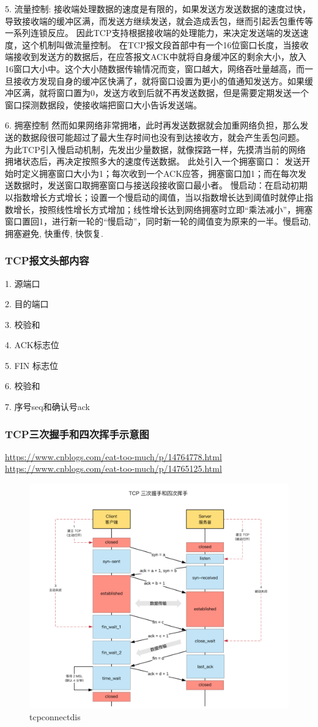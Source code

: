 \documentclass[UTF8]{ctexart}
\begin{document}
5. 流量控制: 接收端处理数据的速度是有限的，如果发送方发送数据的速度过快，导致接收端的缓冲区满，而发送方继续发送，就会造成丢包，继而引起丢包重传等一系列连锁反应。
因此TCP支持根据接收端的处理能力，来决定发送端的发送速度，这个机制叫做流量控制。
在TCP报文段首部中有一个16位窗口长度，当接收端接收到发送方的数据后，在应答报文ACK中就将自身缓冲区的剩余大小，放入16窗口大小中。这个大小随数据传输情况而变，窗口越大，网络吞吐量越高，而一旦接收方发现自身的缓冲区快满了，就将窗口设置为更小的值通知发送方。如果缓冲区满，就将窗口置为0，发送方收到后就不再发送数据，但是需要定期发送一个窗口探测数据段，使接收端把窗口大小告诉发送端。

6. 拥塞控制
然而如果网络非常拥堵，此时再发送数据就会加重网络负担，那么发送的数据段很可能超过了最大生存时间也没有到达接收方，就会产生丢包问题。
为此TCP引入慢启动机制，先发出少量数据，就像探路一样，先摸清当前的网络拥堵状态后，再决定按照多大的速度传送数据。
此处引入一个拥塞窗口：
发送开始时定义拥塞窗口大小为1；每次收到一个ACK应答，拥塞窗口加1；而在每次发送数据时，发送窗口取拥塞窗口与接送段接收窗口最小者。
慢启动：在启动初期以指数增长方式增长；设置一个慢启动的阈值，当以指数增长达到阈值时就停止指数增长，按照线性增长方式增加；线性增长达到网络拥塞时立即“乘法减小”，拥塞窗口置回1，进行新一轮的“慢启动”，同时新一轮的阈值变为原来的一半。慢启动, 拥塞避免, 快重传, 快恢复. \par

\subsubsection{TCP报文头部内容}
1. 源端口

2. 目的端口

3. 校验和

4. ACK标志位

5. FIN 标志位

6. 校验和

7. 序号seq和确认号ack


\subsubsection{TCP三次握手和四次挥手示意图}
\url{https://www.cnblogs.com/eat-too-much/p/14764778.html}
\url{https://www.cnblogs.com/eat-too-much/p/14765125.html}
\begin{figure}
	\centering
	\includegraphics[width=0.7\linewidth]{figures/tcpconnectdis.png}
	\caption{tcpconnectdis}
	\label{fig:tcpconnectdis}
\end{figure}
\end{document}
